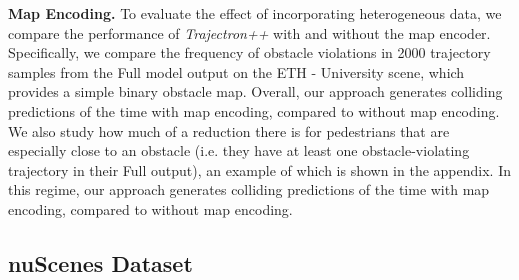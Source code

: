 \documentclass[runningheads]{llncs}
\newcommand{\algname}{\mbox{Trajectron++}}
\newcommand{\emphalgname}{\emph{\algname}}
\begin{document}
{\bf Map Encoding.} To evaluate the effect of incorporating heterogeneous data, we compare the performance of \emphalgname{} with and without the map encoder. Specifically, we compare the frequency of obstacle violations in 2000 trajectory samples from the Full model output on the ETH - University scene, which provides a simple binary obstacle map. Overall, our approach generates colliding predictions  of the time with map encoding, compared to  without map encoding.
We also study how much of a reduction there is for pedestrians that are especially close to an obstacle (i.e. they have at least one obstacle-violating trajectory in their Full output), an example of which is shown in the appendix.
In this regime, our approach generates colliding predictions  of the time with map encoding, compared to  without map encoding.




\subsection{nuScenes Dataset}
\end{document}
